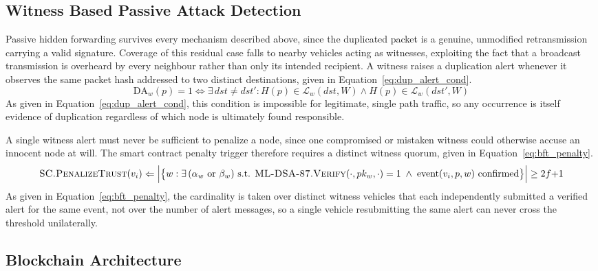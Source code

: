 \documentclass[lettersize,journal]{IEEEtran}
\theoremstyle{plain}
\theoremstyle{remark}
\begin{document}
	
	\subsection{Witness Based Passive Attack Detection}\label{subsec:witness}
	
	Passive hidden forwarding survives every mechanism described above,
	since the duplicated packet is a genuine, unmodified retransmission
	carrying a valid signature. Coverage of this residual case falls to
	nearby vehicles acting as witnesses, exploiting the fact that a
	broadcast transmission is overheard by every neighbour rather than only
	its intended recipient. A witness raises a duplication alert whenever it
	observes the same packet hash addressed to two distinct destinations,
	given in Equation~\eqref{eq:dup_alert_cond}.
	\begin{equation}
		\text{DA}_w(p){=}1\iff
		\exists\,dst{\neq}dst':
		H(p)\in\mathcal{L}_w(dst,W)
		\land H(p)\in\mathcal{L}_w(dst',W)
		\label{eq:dup_alert_cond}
	\end{equation}
	As given in Equation~\eqref{eq:dup_alert_cond}, this condition is
	impossible for legitimate, single path traffic, so any occurrence is
	itself evidence of duplication regardless of which node is ultimately
	found responsible.
	
	A single witness alert must never be sufficient to penalize a node,
	since one compromised or mistaken witness could otherwise accuse an
	innocent node at will. The smart contract penalty trigger therefore
	requires a distinct witness quorum, given in Equation~\eqref{eq:bft_penalty}.
	\begin{equation}
		\textsc{SC.PenalizeTrust}(v_i) \Leftarrow
		\Bigl|\bigl\{
		w : \exists\,(\alpha_w \text{ or } \beta_w)
		\text{ s.t. }
		\textsc{ML-DSA-87.Verify}(\cdot,pk_w,\cdot) = 1
		\;\land\; \text{event}(v_i,p,w)\text{ confirmed}
		\bigr\}\Bigr|
		\geq 2f{+}1
		\label{eq:bft_penalty}
	\end{equation}
	As given in Equation~\eqref{eq:bft_penalty}, the cardinality is taken
	over distinct witness vehicles that each independently submitted a
	verified alert for the same event, not over the number of alert
	messages, so a single vehicle resubmitting the same alert can never
	cross the threshold unilaterally.
	
	
	\subsection{Blockchain Architecture}\label{subsec:blockchain}
	
\end{document}
